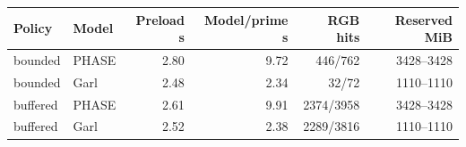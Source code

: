 \begin{tabular}{llrrrr}
\toprule
Policy & Model & Preload s & Model/prime s & RGB hits & Reserved MiB \\
\midrule
bounded & PHASE & 2.80 & 9.72 & 446/762 & 3428--3428 \\
bounded & Garl & 2.48 & 2.34 & 32/72 & 1110--1110 \\
buffered & PHASE & 2.61 & 9.91 & 2374/3958 & 3428--3428 \\
buffered & Garl & 2.52 & 2.38 & 2289/3816 & 1110--1110 \\
\bottomrule
\end{tabular}
